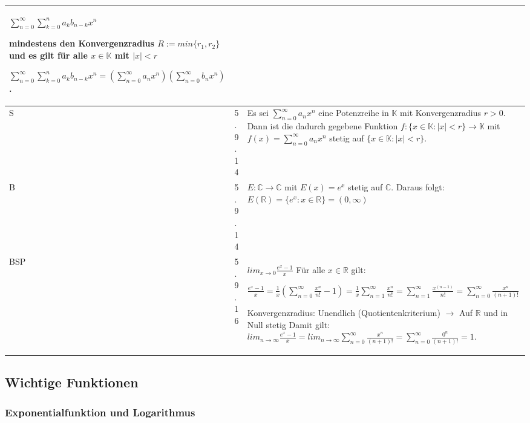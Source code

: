 \begin{longtable}{p{0.75cm} p{1cm} p{16cm}}
                        \centerline{$\sum\limits^{\infty}_{n=0} \sum\limits^{n}_{k=0} a_k b_{n-k} x^n$} 
                        mindestens den Konvergenzradius $R := min\{r_1,r_2\}$ und es gilt für alle $x \in \mathbb{K}$ mit $|x| < r$ \hfill \break
                        \centerline{$\sum\limits^{\infty}_{n=0} \sum\limits^{n}_{k=0} a_k b_{n-k} x^n = (\sum^{\infty}_{n=0}a_n x^n) (\sum^{\infty}_{n=0}b_n x^n)$.} \\
        \midrule
        S   & 5.9.14&   Es sei $\sum^{\infty}_{n=0}a_nx^n$ eine Potenzreihe in $\mathbb{K}$ mit Konvergenzradius $r > 0$. Dann ist die dadurch gegebene Funktion
                    $f: \{x \in \mathbb{K}: |x| < r\} \rightarrow \mathbb{K}$ mit $f(x) = \sum^{\infty}_{n=0}a_nx^n$ stetig auf $\{x \in \mathbb{K}: |x| < r\}$. \\
        \midrule
        B   & 5.9.14&   $E: \mathbb{C} \rightarrow \mathbb{C}$ mit $E(x) = e^x$ stetig auf $\mathbb{C}$. \hfill \break
                        Daraus folgt: $E(\mathbb{R}) = \{e^x: x \in \mathbb{R}\} = (0, \infty)$ \\ 
        \midrule
        BSP & 5.9.16&   $lim_{x \rightarrow 0} \frac{e^x -1}{x}$ \hfill \break
                        Für alle $x \in \mathbb{R}$ gilt: \hfill \break
                        \centerline{$\frac{e^x-1}{x} = \frac{1}{x} (\sum^{\infty}_{n=0} \frac{x^n}{n!}-1) = \frac{1}{x} \sum^{\infty}_{n=1} \frac{x^n}{n!}
                        = \sum^{\infty}_{n=1} \frac{x^(n-1)}{n!} = \sum^{\infty}_{n=0} \frac{x^n}{(n+1)!}$} 
                        Konvergenzradius: Unendlich (Quotientenkriterium) $\rightarrow$ Auf $\mathbb{R}$ und in Null stetig \hfill \break
                        Damit gilt: $lim_{n \rightarrow \infty} \frac{e^x-1}{x} = lim_{n \rightarrow \infty} \sum^{\infty}_{n=0} \frac{x^n}{(n+1)!} =
                        \sum^{\infty}_{n=0} \frac{0^n}{(n+1)!} = 1$. \\
        \bottomrule
        

    \end{longtable}

\subsection{Wichtige Funktionen}
\subsubsection{Exponentialfunktion und Logarithmus}

